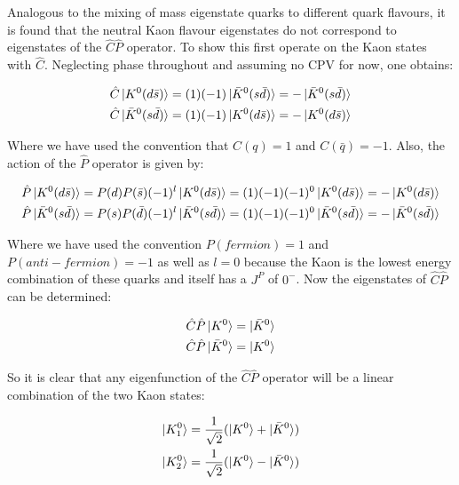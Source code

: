 Analogous to the mixing of mass eigenstate quarks to different quark flavours, it is found that the neutral Kaon flavour eigenstates do not correspond to eigenstates of the $\hat{C}\hat{P}$ operator. To show this first operate on the Kaon states with $\hat{C}$. Neglecting phase throughout and assuming no CPV for now, one obtains:

\begin{align*}
\hat{C} \ket{K^{0}(d \bar{s})} = (1)(-1) \ket{\bar{K}^{0}(s \bar{d})} = - \ket{\bar{K}^{0}(s \bar{d})}  \\
\hat{C} \ket{\bar{K}^{0}(s \bar{d})} = (1)(-1) \ket{K^{0}(d \bar{s})} = - \ket{K^{0}(d \bar{s})}  
\end{align*}

\noindent Where we have used the convention that $C (q) = 1$ and ${C} (\bar{q}) = -1$. Also, the action of the $\hat{P}$ operator is given by:
    
\begin{align*}
\hat{P} \ket{K^{0}(d \bar{s})} = {P}(d) {P}(\bar{s})(-1)^{l} \ket{K^{0}(d \bar{s})} = (1)(-1)(-1)^0 \ket{K^{0}(d \bar{s})} = - \ket{K^{0}(d \bar{s})} \\
\hat{P} \ket{\bar{K}^{0}(s \bar{d})} = {P}(s) {P}(\bar{d})(-1)^{l} \ket{\bar{K}^{0}(s \bar{d})} = (1)(-1)(-1)^0 \ket{\bar{K}^{0}(s \bar{d})} = - \ket{\bar{K}^{0}(s \bar{d})} 
\end{align*}

\smallskip

\noindent Where we have used the convention ${P} (fermion) = 1$ and ${P} (anti-fermion) = -1$ as well as $l=0$ because the Kaon is the lowest energy combination of these quarks and itself has a $J^{P}$ of $0^{-}$. Now the eigenstates of $\hat{C}\hat{P}$ can be determined:

\begin{align*}
\hat{C}\hat{P} \ket{K^{0}} = \ket{\bar{K}^{0}} \\
\hat{C}\hat{P} \ket{\bar{K}^{0}} = \ket{K^{0}} 
\end{align*}

\noindent So it is clear that any eigenfunction of the $\hat{C}\hat{P}$ operator will be a linear combination of the two Kaon states:

\begin{align}
\label{FirstKaonLinComb1}
\ket{K^{0}_{1}} = \frac{1}{\sqrt{2}} (\ket{K^{0}} + \ket{\bar{K}^{0}}) \\
\label{FirstKaonLinComb2}
\ket{K^{0}_{2}} = \frac{1}{\sqrt{2}} (\ket{K^{0}} - \ket{\bar{K}^{0}})
\end{align} 

